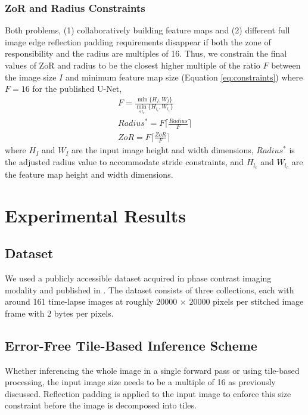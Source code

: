 \documentclass[runningheads]{llncs}
\begin{document}
\subsubsection{ZoR and Radius Constraints}

Both problems, (1) collaboratively building feature maps and (2) different full image edge reflection padding requirements disappear if both the zone of responsibility and the radius are multiples of 16. Thus, we constrain the final values of ZoR and radius to be the closest higher multiple of the ratio $F$ between the image size $I$ and minimum feature map size (Equation \ref{eq:constraints}) where $F=16$ for the published U-Net, 
\begin{equation}
\begin{aligned}
F = \frac{ \min\{H_{I}, W_{I} \} }{ \min_{\forall l_{c}} \{ H_{l_{c}}, W_{l_{c}} \} } \\
Radius^{*} = F \lceil \frac{Radius}{F} \rceil \\
ZoR = F \lceil \frac{ZoR}{F} \rceil 
\end{aligned}
\label{eq:constraints}
\end{equation}
where $H_{I}$ and $W_{I}$ are the input image height and width dimensions, $Radius^{*}$ is the adjusted radius value to accommodate stride constraints, and $H_{l_{c}}$ and $W_{l_{c}}$ are the feature map height and width dimensions. 

\section{Experimental Results}
\label{experimental-results}

\subsection{Dataset}
\label{dataset}

We used a publicly accessible dataset acquired in phase contrast imaging modality and published in \cite{Bhadriraju2016}. 
The dataset consists of three collections, each with around 161 time-lapse images at roughly
$\num{20000}$
$\times$
$\num{20000}$ pixels per stitched image frame with 2 bytes per pixels. 


\subsection{Error-Free Tile-Based Inference Scheme}

Whether inferencing the whole image in a single forward pass or using tile-based processing, the input image size needs to be a multiple of 16 as previously discussed. Reflection padding is applied to the input image to enforce this size constraint before the image is decomposed into tiles. 
\end{document}
